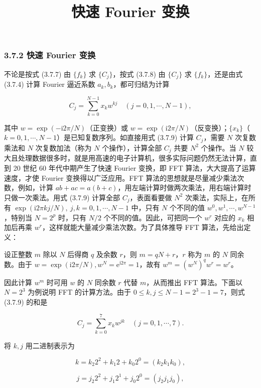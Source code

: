 \documentclass[
  10pt,
  fontset=fandol]{ctexart}
\title{快速 Fourier 变换}
\author{}
\date{}
\begin{document}
\maketitle

\subsubsection{3.7.2 快速 Fourier 变换}\label{ux5febux901f-fourier-ux53d8ux6362}

不论是按式 (3.7.7) 由 \(\{f_k\}\) 求 \(\{C_j\}\)，按式 (3.7.8) 由 \(\{C_j\}\) 求 \(\{f_k\}\)，还是由式 (3.7.4) 计算 Fourier 逼近系数 \(a_k,b_k\)，都可归结为计算

\[
C_j=\sum_{k=0}^{N-1}x_kw^{kj}\quad(j=0,1,\cdots,N-1),\tag{3.7.9}
\]

其中 \(w=\exp(-\mathrm i2\pi/N)\)（正变换）或 \(w=\exp(\mathrm i2\pi/N)\)（反变换）；\(\{x_k\}\)（\(k=0,1,\cdots,N-1\)）是已知复数序列。如直接用式 (3.7.9) 计算 \(C_j\)，需要 \(N\) 次复数乘法和 \(N\) 次复数加法（称为 \(N\) 个操作），计算全部 \(C_j\) 共要 \(N^2\) 个操作。当 \(N\) 较大且处理数据很多时，就是用高速的电子计算机，很多实际问题仍然无法计算，直到 20 世纪 60 年代中期产生了快速 Fourier 变换，即 FFT 算法，大大提高了运算速度，才使 Fourier 变换得以广泛应用。FFT 算法的思想就是尽量减少乘法次数，例如，计算 \(ab+ac=a(b+c)\)，用左端计算时做两次乘法，用右端计算时只做一次乘法。用式 (3.7.9) 计算全部 \(C_j\)，表面看要做 \(N^2\) 次乘法，实际上，在所有 \(\exp(\mathrm i2\pi kj/N),\allowbreak \ j,\allowbreak k=0,\allowbreak 1,\allowbreak \cdots,\allowbreak N-1\) 中，只有 \(N\) 个不同的值 \(w^0,w^1,\cdots,w^{N-1}\)，特别当 \(N=2^p\) 时，只有 \(N/2\) 个不同的值。因此，可把同一个 \(w^r\) 对应的 \(x_k\) 相加后再乘 \(w^r\)，这样就能大量减少乘法次数。为了具体推导 FFT 算法，先给出定义：

设正整数 \(m\) 除以 \(N\) 后得商 \(q\) 及余数 \(r\)，则 \(m=qN+r\)，\(r\) 称为 \(m\) 的 \(N\) 同余数。由于 \(w=\exp(\mathrm i2\pi/N),w^N=\mathrm e^{\mathrm i2\pi}=1\)，故有 \(w^m=(w^N)^qw^r=w^r\)。

因此计算 \(w^m\) 时可用 \(w\) 的 \(N\) 同余数 \(r\) 代替 \(m\)，从而推出 FFT 算法。下面以 \(N=2^3\) 为例说明 FFT 的计算方法。由于 \(0\leqslant k,j\leqslant N-1=2^3-1=7\)，则式 (3.7.9) 的和是

\[
C_j=\sum_{k=0}^7x_kw^{jk}\quad(j=0,1,\cdots,7).\tag{3.7.10}
\]

将 \(k,j\) 用二进制表示为

\[
k=k_2 2^2+k_1 2+k_0 2^0=(k_2k_1k_0),
\]

\[
j=j_2 2^2+j_1 2^1+j_0 2^0=(j_2j_1j_0),
\]
\end{document}
